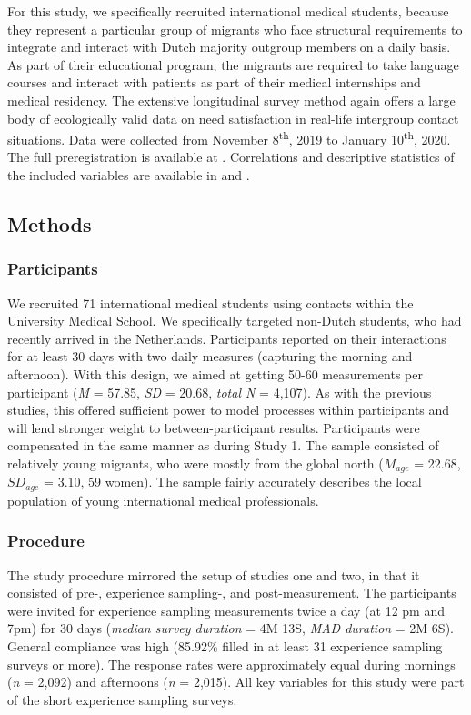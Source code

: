 For this study, we specifically recruited international medical
students, because they represent a particular group of migrants who face
structural requirements to integrate and interact with Dutch majority
outgroup members on a daily basis. As part of their educational program,
the migrants are required to take language courses and interact with
patients as part of their medical internships and medical residency. The
extensive longitudinal survey method again offers a large body of
ecologically valid data on need satisfaction in real-life intergroup
contact situations. Data were collected from November
8\textsuperscript{th}, 2019 to January 10\textsuperscript{th}, 2020. The
full preregistration is available at \citet[][]{KreienkampMasked2021f}.
Correlations and descriptive statistics of the included variables are
available in  and .

\subsection{Methods}

\subsubsection{Participants}

We recruited 71 international medical students using contacts within the
University Medical School. We specifically targeted non-Dutch students,
who had recently arrived in the Netherlands. Participants reported on
their interactions for at least 30 days with two daily measures
(capturing the morning and afternoon). With this design, we aimed at
getting 50-60 measurements per participant (\textit{M} = 57.85,
\textit{SD} = 20.68, \textit{total N} = 4,107). As with the previous
studies, this offered sufficient power to model processes within
participants and will lend stronger weight to between-participant
results. Participants were compensated in the same manner as during
Study 1. The sample consisted of relatively young migrants, who were
mostly from the global north (\(M_{age}\) = 22.68, \(SD_{age}\) = 3.10,
59 women). The sample fairly accurately describes the local population
of young international medical professionals.

\subsubsection{Procedure}

The study procedure mirrored the setup of studies one and two, in that
it consisted of pre-, experience sampling-, and post-measurement. The
participants were invited for experience sampling measurements twice a
day (at 12 pm and 7pm) for 30 days (\textit{median survey duration} = 4M
13S, \textit{MAD duration} = 2M 6S). General compliance was high
(85.92\% filled in at least 31 experience sampling surveys or more). The
response rates were approximately equal during mornings (\textit{n} =
2,092) and afternoons (\textit{n} = 2,015). All key variables for this
study were part of the short experience sampling surveys.

